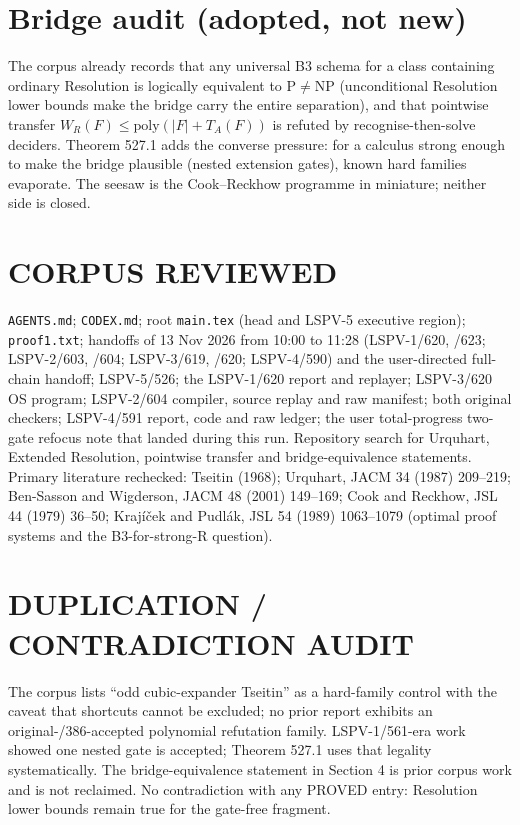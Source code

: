 \documentclass[11pt]{article}
\begin{document}
\section{Bridge audit (adopted, not new)}
The corpus already records that any universal B3 schema for a class containing ordinary Resolution
is logically equivalent to P$\ne$NP (unconditional Resolution lower bounds make the bridge carry the
entire separation), and that pointwise transfer $W_R(F)\le\mathrm{poly}(|F|+T_A(F))$ is refuted by
recognise-then-solve deciders. Theorem 527.1 adds the converse pressure: for a calculus strong
enough to make the bridge plausible (nested extension gates), known hard families evaporate. The
seesaw is the Cook--Reckhow programme in miniature; neither side is closed.

\section{CORPUS REVIEWED}
\texttt{AGENTS.md}; \texttt{CODEX.md}; root \texttt{main.tex} (head and LSPV-5 executive region);
\texttt{proof1.txt}; handoffs of 13 Nov 2026 from 10:00 to 11:28 (LSPV-1/620, /623; LSPV-2/603,
/604; LSPV-3/619, /620; LSPV-4/590) and the user-directed full-chain handoff; LSPV-5/526; the
LSPV-1/620 report and replayer; LSPV-3/620 OS program; LSPV-2/604 compiler, source replay and
raw manifest; both original checkers; LSPV-4/591 report, code and raw ledger; the user total-progress
two-gate refocus note that landed during this run. Repository search for
Urquhart, Extended Resolution, pointwise transfer and bridge-equivalence statements.
Primary literature rechecked: Tseitin (1968); Urquhart, JACM 34 (1987) 209--219; Ben-Sasson and
Wigderson, JACM 48 (2001) 149--169; Cook and Reckhow, JSL 44 (1979) 36--50; Krajíček and Pudlák,
JSL 54 (1989) 1063--1079 (optimal proof systems and the B3-for-strong-R question).

\section{DUPLICATION / CONTRADICTION AUDIT}
The corpus lists ``odd cubic-expander Tseitin'' as a hard-family control with the caveat that
shortcuts cannot be excluded; no prior report exhibits an original-/386-accepted polynomial
refutation family. LSPV-1/561-era work showed one nested gate is accepted; Theorem 527.1 uses that
legality systematically. The bridge-equivalence statement in Section 4 is prior corpus work and is
not reclaimed. No contradiction with any PROVED entry: Resolution lower bounds remain true for the
gate-free fragment.
\end{document}
